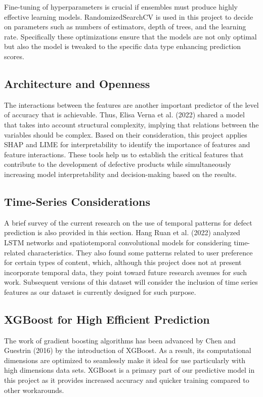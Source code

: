 \documentclass[conference]{IEEEtran}
\begin{document}
Fine-tuning of hyperparameters is crucial if ensembles must produce highly effective learning models. RandomizedSearchCV is used in this project to decide on parameters such as numbers of estimators, depth of trees, and the learning rate. Specifically these optimizations ensure that the models are not only optimal but also the model is tweaked to the specific data type enhancing prediction scores.

\subsection{Architecture and Openness}
The interactions between the features are another important predictor of the level of accuracy that is achievable. Thus, Elisa Verna et al. (2022) \cite{verna2022defect} shared a model that takes into account structural complexity, implying that relations between the variables should be complex. Based on their consideration, this project applies SHAP and LIME for interpretability to identify the importance of features and feature interactions. These tools help us to establish the critical features that contribute to the development of defective products while simultaneously increasing model interpretability and decision-making based on the results.

\subsection{Time-Series Considerations}
A brief survey of the current research on the use of temporal patterns for defect prediction is also provided in this section. Hang Ruan et al. (2022) \cite{ruan2022deep} analyzed LSTM networks and spatiotemporal convolutional models for considering time-related characteristics. They also found some patterns related to user preference for certain types of content, which, although this project does not at present incorporate temporal data, they point toward future research avenues for such work. Subsequent versions of this dataset will consider the inclusion of time series features as our dataset is currently designed for such purpose.

\subsection{XGBoost for High Efficient Prediction}
The work of gradient boosting algorithms has been advanced by Chen and Guestrin (2016) \cite{xgboost2021example} by the introduction of XGBoost. As a result, its computational dimensions are optimized to seamlessly make it ideal for use particularly with high dimensions data sets. XGBoost is a primary part of our predictive model in this project as it provides increased accuracy and quicker training compared to other workarounds.
\end{document}
